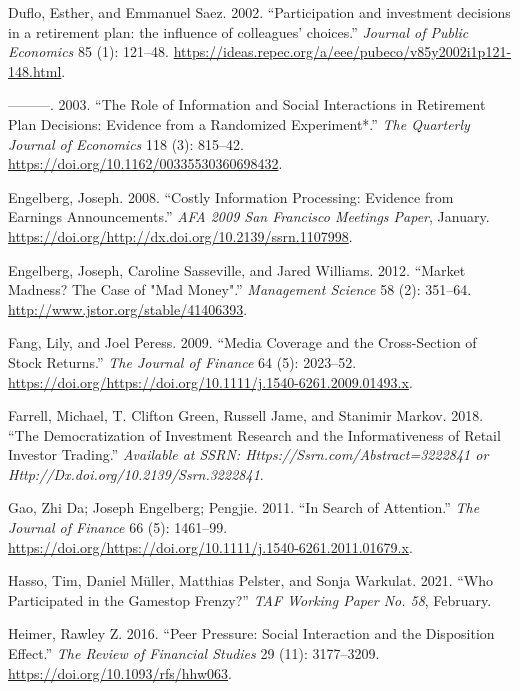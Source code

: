\documentclass[12pt,]{article}
\begin{document}
\leavevmode\hypertarget{ref-duflo2002}{}%
Duflo, Esther, and Emmanuel Saez. 2002. ``Participation and investment
decisions in a retirement plan: the influence of colleagues' choices.''
\emph{Journal of Public Economics} 85 (1): 121--48.
\url{https://ideas.repec.org/a/eee/pubeco/v85y2002i1p121-148.html}.

\leavevmode\hypertarget{ref-duflo2003}{}%
---------. 2003. ``The Role of Information and Social Interactions in
Retirement Plan Decisions: Evidence from a Randomized Experiment*.''
\emph{The Quarterly Journal of Economics} 118 (3): 815--42.
\url{https://doi.org/10.1162/00335530360698432}.

\leavevmode\hypertarget{ref-engelberg2008}{}%
Engelberg, Joseph. 2008. ``Costly Information Processing: Evidence from
Earnings Announcements.'' \emph{AFA 2009 San Francisco Meetings Paper},
January.
\href{https://doi.org/http://dx.doi.org/10.2139/ssrn.1107998\%20}{https://doi.org/http://dx.doi.org/10.2139/ssrn.1107998}.

\leavevmode\hypertarget{ref-engelberg2012}{}%
Engelberg, Joseph, Caroline Sasseville, and Jared Williams. 2012.
``Market Madness? The Case of "Mad Money".'' \emph{Management Science}
58 (2): 351--64. \url{http://www.jstor.org/stable/41406393}.

\leavevmode\hypertarget{ref-fang2009}{}%
Fang, Lily, and Joel Peress. 2009. ``Media Coverage and the
Cross-Section of Stock Returns.'' \emph{The Journal of Finance} 64 (5):
2023--52.
\url{https://doi.org/https://doi.org/10.1111/j.1540-6261.2009.01493.x}.

\leavevmode\hypertarget{ref-farrell2018}{}%
Farrell, Michael, T. Clifton Green, Russell Jame, and Stanimir Markov.
2018. ``The Democratization of Investment Research and the
Informativeness of Retail Investor Trading.'' \emph{Available at SSRN:
Https://Ssrn.com/Abstract=3222841 or
Http://Dx.doi.org/10.2139/Ssrn.3222841}.

\leavevmode\hypertarget{ref-da2011}{}%
Gao, Zhi Da; Joseph Engelberg; Pengjie. 2011. ``In Search of
Attention.'' \emph{The Journal of Finance} 66 (5): 1461--99.
\url{https://doi.org/https://doi.org/10.1111/j.1540-6261.2011.01679.x}.

\leavevmode\hypertarget{ref-hasso2021}{}%
Hasso, Tim, Daniel Müller, Matthias Pelster, and Sonja Warkulat. 2021.
``Who Participated in the Gamestop Frenzy?'' \emph{TAF Working Paper No.
58}, February.

\leavevmode\hypertarget{ref-heimer2016}{}%
Heimer, Rawley Z. 2016. ``Peer Pressure: Social Interaction and the
Disposition Effect.'' \emph{The Review of Financial Studies} 29 (11):
3177--3209. \url{https://doi.org/10.1093/rfs/hhw063}.
\end{document}
